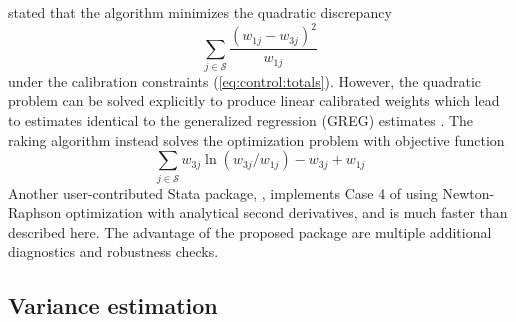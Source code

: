 \citet{deming:stephan:1940} stated that the algorithm minimizes the quadratic
discrepancy
$$
    \sum_{j \in \mathcal{S}} \frac{ (w_{1j}-w_{3j})^2}{w_{1j}}
$$
under the calibration constraints (\ref{eq:control:totals}).
However, the quadratic problem can be solved explicitly to
produce linear calibrated weights which lead to estimates
identical to the generalized regression (GREG) estimates
\citep[Case 1]{deville:sarndal:1992}. The raking algorithm instead solves
the optimization problem with objective function
\citep[Case 2]{deville:sarndal:1992}
\begin{equation}
    \sum_{j \in \mathcal{S}} w_{3j} \ln( w_{3j}/w_{1j}) - w_{3j} + w_{1j}
    \label{eq:raking:discrepancy}
\end{equation}
Another user-contributed Stata package, 
\citep{wittenberg:2010}, implements Case 4 of \citet{deville:sarndal:1992} using
Newton-Raphson optimization with analytical second derivatives,
and is much faster than  described here.
The advantage of the proposed package are multiple additional
diagnostics and robustness checks.

\subsection{Variance estimation}
\label{subsec:variance}

